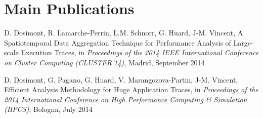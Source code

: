 \section{Main Publications}

\cvline{[1]}%
{\small D. Dosimont, R. Lamarche-Perrin, L.M. Schnorr, G. Huard, J-M. Vincent, A 
Spatiotemporal Data Aggregation Technique for Performance Analysis of 
Large-scale Execution Traces, in \emph{Proceedings of the 2014 IEEE 
International Conference on Cluster Computing (CLUSTER'14)}, Madrid, September 
2014}

\cvline{[2]}%
{\small D. Dosimont, G. Pagano, G. Huard, V. Marangozova-Partin, 
J-M. Vincent, Efficient Analysis Methodology for Huge Application Traces, in 
\emph{Proceedings of the 2014 International Conference on High Performance 
Computing \& Simulation (HPCS)}, Bologna, July 2014}
